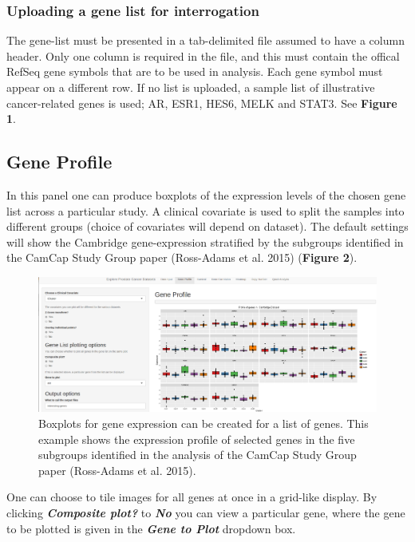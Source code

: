 \documentclass[]{article}
\begin{document}
\subsubsection{Uploading a gene list for
interrogation}\label{uploading-a-gene-list-for-interrogation}

The gene-list must be presented in a tab-delimited file assumed to have
a column header. Only one column is required in the file, and this must
contain the offical RefSeq gene symbols that are to be used in analysis.
Each gene symbol must appear on a different row. If no list is uploaded,
a sample list of illustrative cancer-related genes is used; AR, ESR1,
HES6, MELK and STAT3. See \textbf{Figure 1}.

\subsection{Gene Profile}\label{gene-profile}

In this panel one can produce boxplots of the expression levels of the
chosen gene list across a particular study. A clinical covariate is used
to split the samples into different groups (choice of covariates will
depend on dataset). The default settings will show the Cambridge
gene-expression stratified by the subgroups identified in the CamCap
Study Group paper (Ross-Adams et al. 2015) (\textbf{Figure 2}).

\begin{figure}[htbp]
\centering
\includegraphics{Figure2.png}
\caption{Boxplots for gene expression can be created for a list of
genes. This example shows the expression profile of selected genes in
the five subgroups identified in the analysis of the CamCap Study Group
paper (Ross-Adams et al. 2015).}
\end{figure}

One can choose to tile images for all genes at once in a grid-like
display. By clicking \textbf{\emph{Composite plot?}} to
\textbf{\emph{No}} you can view a particular gene, where the gene to be
plotted is given in the \textbf{\emph{Gene to Plot}} dropdown box.
\end{document}

